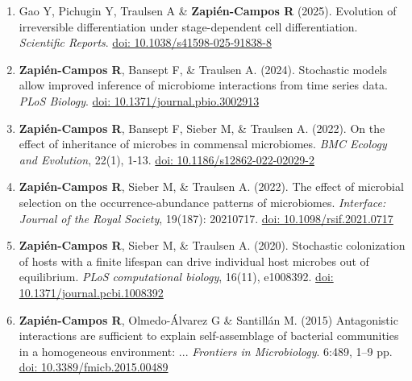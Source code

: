 \documentclass[]{friggeri-cv} %
\begin{document}
\begin{enumerate}

\item  Gao Y, Pichugin Y, Traulsen A \& \textbf{Zapién-Campos R} (2025). Evolution of irreversible differentiation under stage-dependent cell differentiation. \textit{Scientific Reports}. \href{https://doi.org/10.1038/s41598-025-91838-8}{doi: 10.1038/s41598-025-91838-8}

\item \textbf{Zapién-Campos R}, Bansept F, \& Traulsen A. (2024). Stochastic models allow improved inference of microbiome interactions from time series data. \textit{PLoS Biology}. \href{https://doi.org/10.1371/journal.pbio.3002913}{doi: 10.1371/journal.pbio.3002913}

\item  \textbf{Zapién-Campos R}, Bansept F, Sieber M, \& Traulsen A. (2022). On the effect of inheritance of microbes in commensal microbiomes. \textit{BMC Ecology and Evolution}, 22(1), 1-13. \href{https://doi.org/10.1186/s12862-022-02029-2}{doi: 10.1186/s12862-022-02029-2}

\item  \textbf{Zapién-Campos R}, Sieber M, \& Traulsen A. (2022). The effect of microbial selection on the occurrence-abundance patterns of microbiomes. \textit{Interface: Journal of the Royal Society}, 19(187): 20210717. \href{https://doi.org/10.1098/rsif.2021.0717}{doi: 10.1098/rsif.2021.0717}

\item \textbf{Zapién-Campos R}, Sieber M, \& Traulsen A. (2020). Stochastic colonization of hosts with a finite lifespan can drive individual host microbes out of equilibrium. \textit{PLoS computational biology}, 16(11), e1008392. \href{https://doi.org/10.1371/journal.pcbi.1008392}{doi: 10.1371/journal.pcbi.1008392}

\item \textbf{Zapién-Campos R}, Olmedo-Álvarez G \& Santillán M. (2015) Antagonistic interactions are sufficient to explain self-assemblage of bacterial communities in a homogeneous environment: ... \textit{Frontiers in Microbiology}. 6:489, 1--9 pp. \href{http://dx.doi.org/10.3389/fmicb.2015.00489}{doi: 10.3389/fmicb.2015.00489}

\end{enumerate}
\end{document}

